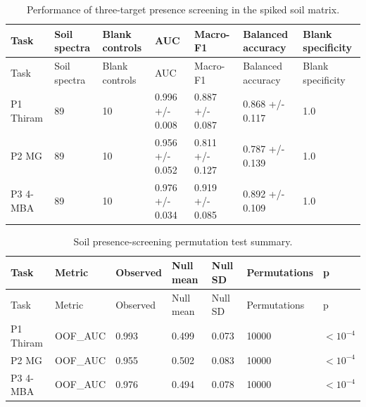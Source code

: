 {\footnotesize
\setlength{\tabcolsep}{2.5pt}
\renewcommand{\arraystretch}{1.08}
\begin{longtable}{L{2.0cm}L{1.35cm}L{1.35cm}L{2.1cm}L{2.1cm}L{2.4cm}L{1.7cm}}
\caption{Performance of three-target presence screening in the spiked soil matrix.}\label{tab:s6_soil_screening_metrics}\\
\toprule
Task & Soil spectra & Blank controls & AUC & Macro-F1 & Balanced accuracy & Blank specificity \\
\midrule
\endfirsthead
\toprule
Task & Soil spectra & Blank controls & AUC & Macro-F1 & Balanced accuracy & Blank specificity \\
\midrule
\endhead
\endfoot
\bottomrule
\endlastfoot
P1 Thiram & 89 & 10 & 0.996 +/- 0.008 & 0.887 +/- 0.087 & 0.868 +/- 0.117 & 1.0 \\
P2 MG & 89 & 10 & 0.956 +/- 0.052 & 0.811 +/- 0.127 & 0.787 +/- 0.139 & 1.0 \\
P3 4-MBA & 89 & 10 & 0.976 +/- 0.034 & 0.919 +/- 0.085 & 0.892 +/- 0.109 & 1.0 \\
\end{longtable}
}


{\footnotesize
\setlength{\tabcolsep}{2.5pt}
\renewcommand{\arraystretch}{1.08}
\begin{longtable}{L{3.0cm}L{1.7cm}L{1.5cm}L{1.7cm}L{1.6cm}L{2.0cm}L{1.6cm}}
\caption{Soil presence-screening permutation test summary.}\label{tab:s7_soil_permutation}\\
\toprule
Task & Metric & Observed & Null mean & Null SD & Permutations & p \\
\midrule
\endfirsthead
\toprule
Task & Metric & Observed & Null mean & Null SD & Permutations & p \\
\midrule
\endhead
\endfoot
\bottomrule
\endlastfoot
P1 Thiram & OOF\_AUC & 0.993 & 0.499 & 0.073 & 10000 & $<10^{-4}$ \\
P2 MG & OOF\_AUC & 0.955 & 0.502 & 0.083 & 10000 & $<10^{-4}$ \\
P3 4-MBA & OOF\_AUC & 0.976 & 0.494 & 0.078 & 10000 & $<10^{-4}$ \\
\end{longtable}
}


